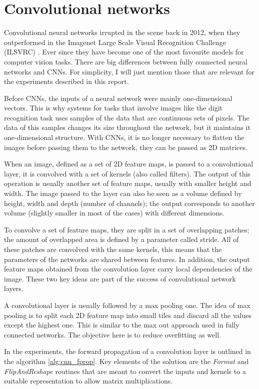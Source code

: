 \documentclass{article}
\begin{document}
\section{Convolutional networks}
Convolutional neural networks irrupted in the scene back in 2012, when they outperformed in the Imagenet Large Scale Visual Recognition Challenge (ILSVRC) \citep{krizhevsky2012imagenet}. Ever since they have become one of the most favourite models for computer vision tasks. There are big differences between fully connected neural networks and CNNs. For simplicity, I will just mention those that are relevant for the experiments described in this report.

Before CNNs, the inputs of a neural network were mainly one-dimensional vectors. This is why systems for tasks that involve images like the digit recognition task uses samples of the data that are continuous sets of pixels. The data of this samples changes its size throughout the network, but it maintains it one-dimensional structure. With CNNs, it is no longer necessary to flatten the images before passing them to the network, they can be passed as 2D matrices.

When an image, defined as a set of 2D feature maps, is passed to a convolutional layer, it is convolved with a set of kernels (also called filters). The output of this operation is usually another set of feature maps, usually with smaller height and width. The image passed to the layer can also be seen as a volume defined by height, width and depth (number of channels); the output corresponds to another volume (slightly smaller in most of the cases) with different dimensions. 

To convolve a set of feature maps, they are split in a set of overlapping patches; the amount of overlapped area is defined by a parameter called stride. All of these patches are convolved with the same kernels, this means that the parameters of the networks are shared between features. In addition, the output feature maps obtained from the convolution layer carry local dependencies of the image. These two key ideas are part of the success of convolutional network layers.

A convolutional layer is usually followed by a max pooling one. The idea of max pooling is to split each 2D feature map into small tiles and discard all the values except the highest one. This is similar to the max out approach used in fully connected networks. The objective here is to reduce overfitting as well.

In the experiments, the forward propagation of a convolution layer is outlined in the algorithm \ref{alg:cnn_fprop}. Key elements of the solution are the \textit{Format} and \textit{FlipAndReshape} routines that are meant to convert the inputs and kernels to a suitable representation to allow matrix multiplications.
\end{document}
